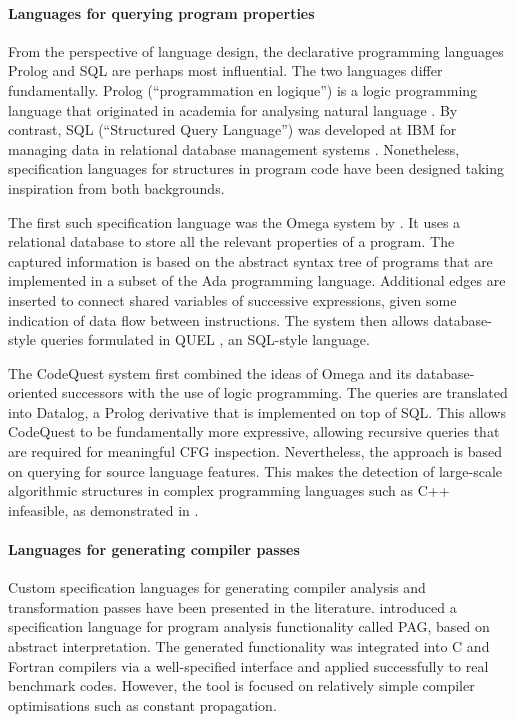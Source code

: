     \paragraph*{Languages for querying program properties}
    From the perspective of language design, the declarative programming
    languages Prolog and SQL are perhaps most influential.
    The two languages differ fundamentally.
    Prolog (``programmation en logique'') is a logic programming language that
    originated in academia for analysing natural language
    \citep{Colmerauer:1993:BP:154766.155362}.
    By contrast, SQL (``Structured Query Language'') was developed at IBM for
    managing data in relational database management systems
    \citep{Chamberlin:1974:SSE:800296.811515}.
    Nonetheless, specification languages for structures in program code have
    been designed taking inspiration from both backgrounds.

    The first such specification language was the Omega system by
    \citet{Linton:CSD-83-164}.
    It uses a relational database to store all the relevant properties of a
    program.
    The captured information is based on the abstract syntax tree of programs
    that are implemented in a subset of the Ada programming language.
    Additional edges are inserted to connect shared variables of
    successive expressions, given some indication of data flow between
    instructions.
    The system then allows database-style queries formulated in QUEL
    \citep{Stonebraker:1976:DII:320473.320476}, an SQL-style language.

    The CodeQuest system \citep{Hajiyev:2006:CSS:2171327.2171331} first combined
    the ideas of Omega and its database-oriented successors with the use
    of logic programming.
    The queries are translated into Datalog, a Prolog derivative that is
    implemented on top of SQL.
    This allows CodeQuest to be fundamentally more expressive, allowing
    recursive queries that are required for meaningful CFG inspection.
    Nevertheless, the approach is based on querying for source language
    features.
    This makes the detection of large-scale algorithmic structures in complex
    programming languages such as C++ infeasible, as demonstrated in
    .

    \paragraph*{Languages for generating compiler passes}
    Custom specification languages for generating compiler analysis and
    transformation passes have been presented in the literature.
    \citet{Martin1998} introduced a specification language for program analysis
    functionality called PAG, based on abstract interpretation.
    The generated functionality was integrated into C and Fortran compilers via
    a well-specified interface and applied successfully to real benchmark codes.
    However, the tool is focused on relatively simple compiler optimisations
    such as constant propagation.


